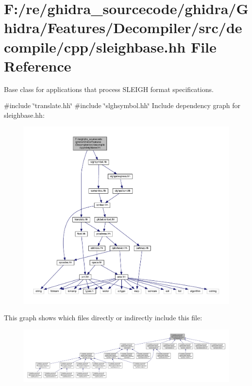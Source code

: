 \hypertarget{sleighbase_8hh}{}\section{F\+:/re/ghidra\+\_\+sourcecode/ghidra/\+Ghidra/\+Features/\+Decompiler/src/decompile/cpp/sleighbase.hh File Reference}
\label{sleighbase_8hh}


Base class for applications that process S\+L\+E\+I\+GH format specifications.  


{\ttfamily \#include \char`\"{}translate.\+hh\char`\"{}}\newline
{\ttfamily \#include \char`\"{}slghsymbol.\+hh\char`\"{}}\newline
Include dependency graph for sleighbase.\+hh\+:
\nopagebreak
\begin{figure}[H]
\begin{center}
\leavevmode
\includegraphics[width=350pt]{sleighbase_8hh__incl}
\end{center}
\end{figure}
This graph shows which files directly or indirectly include this file\+:
\nopagebreak
\begin{figure}[H]
\begin{center}
\leavevmode
\includegraphics[width=350pt]{sleighbase_8hh__dep__incl}
\end{center}
\end{figure}
